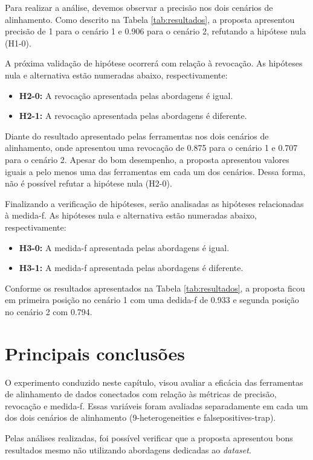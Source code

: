Para realizar a análise, devemos observar a precisão nos dois cenários de alinhamento. Como descrito na Tabela \ref{tab:resultados}, a proposta apresentou precisão de 1 para o cenário 1 e 0.906 para o cenário 2, refutando a hipótese nula (H1-0).

A próxima validação de hipótese ocorrerá com relação à revocação. As hipóteses nula e alternativa estão numeradas abaixo, respectivamente:

\begin{itemize}
\item \textbf{H2-0:} A revocação apresentada pelas abordagens é igual.
\item \textbf{H2-1:} A revocação apresentada pelas abordagens é diferente.
\end{itemize}

Diante do resultado apresentado pelas ferramentas nos dois cenários de alinhamento, onde apresentou uma revocação de 0.875 para o cenário 1 e 0.707 para o cenário 2. Apesar do bom desempenho, a proposta apresentou valores iguais a pelo menos uma das ferramentas em cada um dos cenários. Dessa forma, não é possível refutar a hipótese nula (H2-0).

Finalizando a verificação de hipóteses, serão analisadas as hipóteses relacionadas à medida-f. As hipóteses nula e alternativa estão numeradas abaixo, respectivamente:

\begin{itemize}
\item \textbf{H3-0:} A medida-f apresentada pelas abordagens é igual.
\item \textbf{H3-1:} A medida-f apresentada pelas abordagens é diferente.
\end{itemize}

Conforme os resultados apresentados na Tabela \ref{tab:resultados}, a proposta ficou em primeira posição no cenário 1 com uma dedida-f de 0.933 e segunda posição no cenário 2 com 0.794.

\section{Principais conclusões}
O experimento conduzido neste capítulo, visou avaliar a eficácia das ferramentas de alinhamento de dados conectados com relação às métricas de precisão, revocação e medida-f. Essas variáveis foram avaliadas separadamente em cada um dos dois cenários de alinhamento (9-heterogeneities e falsepositives-trap).

Pelas análises realizadas, foi possível verificar que a proposta apresentou bons resultados mesmo não utilizando abordagens dedicadas ao \textit{dataset}.